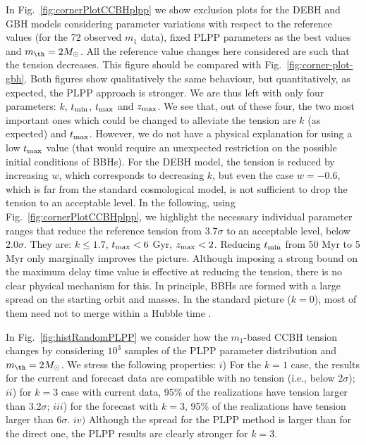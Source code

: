 \documentclass[fleqn,usenatbib,useAMS]{mnras}
\begin{document}
In Fig.~\ref{fig:cornerPlotCCBHplpp} we show exclusion plots for the DEBH and GBH models considering parameter variations with respect to the reference values (for the 72 observed $m_1$ data), fixed PLPP parameters as the best values and $m_{\th} = 2 M_\odot$. All the reference value changes here considered are such that the tension  decreases. This figure should be compared with Fig.~\ref{fig:corner-plot-gbh}. Both figures show qualitatively the same behaviour, but quantitatively, as expected, the PLPP approach is stronger.  
{We are thus left with only four parameters: $k$, $t_{\rm min}$, $t_{\rm max}$ and $z_{\rm max}$. We see that, out of these four, the two most important ones which could be changed to alleviate the tension are $k$ (as expected) and $t_{\rm max}$. However,} {we do not have a physical explanation for using a low $t_{\rm max}$ value (that would require an unexpected  restriction on the possible initial conditions of BBHs).}
For the DEBH model, the tension is reduced by increasing $w$, which corresponds to decreasing $k$, but even the case $w=-0.6$, which is far from the standard cosmological model, is not sufficient to drop the tension to an acceptable level. In the following, using Fig.~\ref{fig:cornerPlotCCBHplpp}, we highlight the necessary individual parameter ranges that reduce the reference tension from 3.7$\sigma$ to an acceptable level, below 2.0$\sigma$. They are: $k \leq 1.7$, $t_{\rm max} < 6$ Gyr, $z_{\rm max} < 2$. Reducing $t_{\rm min}$ from 50 Myr to 5 Myr only marginally improves the picture. Although imposing a strong bound on the maximum delay time value is effective at reducing the tension, there is no clear physical mechanism for this. In principle, BBHs are formed with a large spread on the starting orbit and masses. {In the standard picture ($k=0$), most of them need not to merge within a Hubble time \cite[e.g.,][]{Ghodla:2023iaz}.}

In Fig.~\ref{fig:histRandomPLPP} we consider how the $m_1$-based CCBH tension changes by considering $10^3$ samples of the PLPP parameter distribution \citep{ligo_scientific_collaboration_and_virgo_2023_7843926} and $m_{\th} = 2 M_\odot$. We stress the following properties: $i$) For the $k=1$ case, the results for the current and forecast data are compatible with no tension (i.e., below 2$\sigma$); $ii$) for $k=3$ case with current data, 95\% of the realizations have tension larger than 3.2$\sigma$; $iii$) for the forecast with $k=3$, 95\% of the realizations have tension larger than $6 \sigma$. $iv)$  Although the spread for the PLPP method is larger than for the direct one, the PLPP results are clearly stronger for $k=3$.
\end{document}
